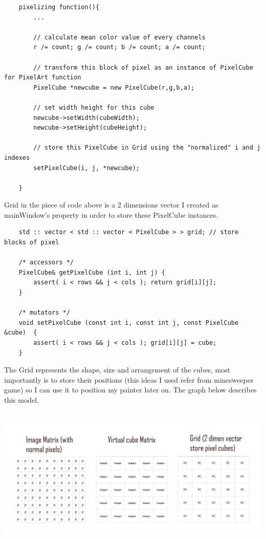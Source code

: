 \documentclass[english]{article}
\begin{document}
{\lstset{language=C++}
\begin{lstlisting}
	pixelizing function(){
		...
		
		// calculate mean color value of every channels
		r /= count; g /= count; b /= count; a /= count;
	
		// transform this block of pixel as an instance of PixelCube for PixelArt function
		PixelCube *newcube = new PixelCube(r,g,b,a);
		
		// set width height for this cube
		newcube->setWidth(cubeWidth);
		newcube->setHeight(cubeHeight);
		
		// store this PixelCube in Grid using the "normalized" i and j indexes
		setPixelCube(i, j, *newcube);
		
	}
\end{lstlisting}

Grid in the piece of code above is a 2 dimensions vector I created as mainWindow's property in order to store these PixelCube instances.

\lstset{language=C++}
\begin{lstlisting}
	std :: vector < std :: vector < PixelCube > > grid; // store blocks of pixel
	
	/* accessors */
	PixelCube& getPixelCube (int i, int j) {
		assert( i < rows && j < cols ); return grid[i][j];
	}
	
	/* mutators */
	void setPixelCube (const int i, const int j, const PixelCube &cube)  {
		assert( i < rows && j < cols ); grid[i][j] = cube;
	}
\end{lstlisting}  

The Grid represents the shape, size and arrangement of the cubes, most importantly is to store their positions (this ideas I used refer from minesweeper game) so I can use it to position my painter later on. The graph below describes this model.

\begin{center}
	\includegraphics[width=\linewidth,height=7cm]{img/model.jpg}	
\end{center} 


}
\end{document}
